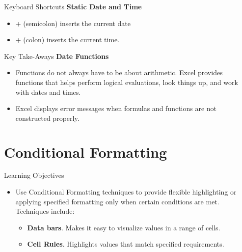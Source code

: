 \begin{center}
	\begin{shtcutbox}{Keyboard Shortcuts}
		\textbf{Static Date and Time}
		\\
		\begin{itemize}
			\setlength{\itemsep}{0pt}
			\setlength{\parskip}{0pt}
			\setlength{\parsep}{0pt}

			\item {} + \fmtKeystroke{;} (semicolon) inserts the current date
			\item {} + \fmtKeystroke{:} (colon) inserts the current time.
			
		\end{itemize}
	\end{shtcutbox}
\end{center}


\begin{center}
	\begin{tkwbox}{Key Take-Aways}
		\textbf{Date Functions}
		\\
		\begin{itemize}
			\setlength{\itemsep}{0pt}
			\setlength{\parskip}{0pt}
			\setlength{\parsep}{0pt}

			\item Functions do not always have to be about arithmetic. Excel provides functions that helps perform logical evaluations, look things up, and work with dates and times.
			\item Excel displays error messages when formulas and functions are not constructed properly.
			
		\end{itemize}
	\end{tkwbox}
\end{center}

\section{Conditional Formatting}

\begin{center}
	\begin{objbox}{Learning Objectives}
		\begin{itemize}
			\setlength{\itemsep}{0pt}
			\setlength{\parskip}{0pt}
			\setlength{\parsep}{0pt}

			\item Use Conditional Formatting techniques to provide flexible highlighting or applying specified formatting only when certain conditions are met. Techniques include:

			\begin{itemize}			
				\item \textbf{Data bars}. Makes it easy to visualize values in a range of cells.
				\item \textbf{Cell Rules}. Highlights values that match specified requirements.
			\end{itemize}

		\end{itemize}
	\end{objbox}
\end{center}

